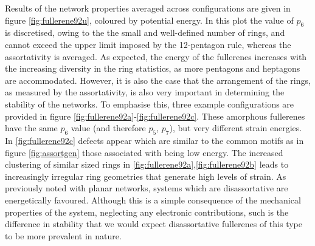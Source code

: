 Results of the network properties averaged across configurations are given in figure \ref{fig:fullerene92u}, coloured by potential energy.
In this plot the value of $p_6$ is discretised, owing to the the small and well\--defined number of rings, and cannot exceed the upper limit imposed by the 12\--pentagon rule, whereas the assortativity is averaged.
As expected, the energy of the fullerenes increases with the increasing diversity in the ring statistics, as more pentagons and heptagons are accommodated.
However, it is also the case that the arrangement of the rings, as measured by the assortativity, is also very important in determining the stability of the networks.
To emphasise this, three example configurations are provided in figure \ref{fig:fullerene92a}\--\ref{fig:fullerene92c}.
These amorphous fullerenes have the same $p_6$ value (and therefore $p_5$, $p_7$), but very different strain energies.
In \ref{fig:fullerene92c} defects appear which are similar to the common motifs as in figure \ref{fig:assortgen} \ie{} those associated with being low energy.
The increased clustering of similar sized rings in \ref{fig:fullerene92a},\ref{fig:fullerene92b} leads to increasingly irregular ring geometries that generate high levels of strain.
As previously noted with planar networks, systems which are disassortative are energetically favoured.
Although this is a simple consequence of the mechanical properties of the system, neglecting any electronic contributions, such is the difference in stability that we would expect disassortative fullerenes of this type to be more prevalent in nature.

